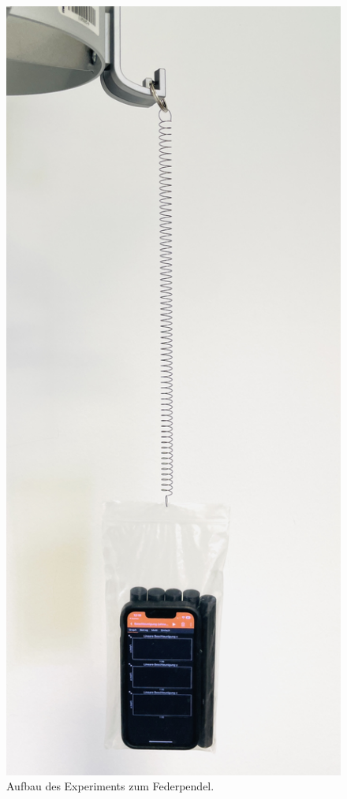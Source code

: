 \documentclass[12pt]{scrbook}
\begin{document}
\begin{figure}[h]
\center
\includegraphics[scale=0.4]{Federpendel.jpg}
\caption{Aufbau des Experiments zum Federpendel.}
\label{federaufbau}
\end{figure}
\end{document}
